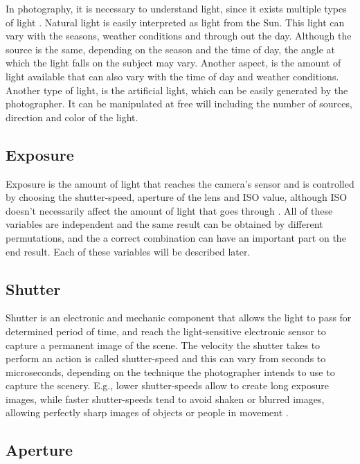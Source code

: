 In photography, it is necessary to understand light, since it exists multiple types of light \cite{Santos}. Natural light is easily interpreted as light from the Sun. This light can vary with the seasons, weather conditions and through out the day. Although the source is the same, depending on the season and the time of day, the angle at which the light falls on the subject may vary. Another aspect, is the amount of light available that can also vary with the time of day and weather conditions.
Another type of light, is the artificial light, which can be easily generated by the photographer. It can be manipulated at free will including the number of sources, direction and color of the light.


\subsection{Exposure}
\label{sub:exposure}

Exposure is the amount of light that reaches the camera's sensor and is controlled by choosing the shutter-speed, aperture of the lens and ISO value, although ISO doesn't necessarily affect the amount of light that goes through \cite{Kamps2012} \cite{Santos}. All of these variables are independent and the same result can be obtained by different permutations, and the a correct combination can have an important part on the end result. Each of these variables will be described later.

\subsection{Shutter}
\label{sub:shutter}

Shutter is an electronic and mechanic component that allows the light to pass for determined period of time, and reach the light-sensitive electronic sensor to capture a permanent image of the scene. The velocity the shutter takes to perform an action is called shutter-speed and this can vary from seconds to microseconds, depending on the technique the photographer intends to use to capture the scenery. E.g., lower shutter-speeds allow to create long exposure images, while faster shutter-speeds tend to avoid shaken or blurred images, allowing perfectly sharp images of objects or people in movement \cite{Santos}.

\subsection{Aperture}
\label{sub:aperture}

